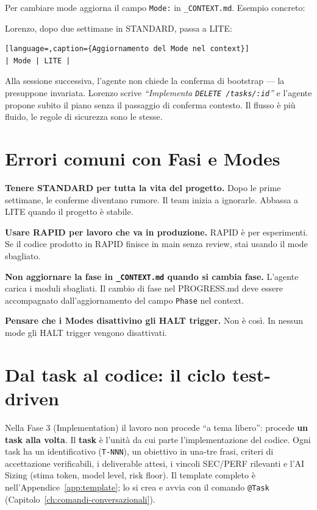 Per cambiare mode aggiorna il campo \texttt{Mode:} in \texttt{\_CONTEXT.md}. Esempio concreto:

Lorenzo, dopo due settimane in STANDARD, passa a LITE:

\begin{lstlisting}[language=,caption={Aggiornamento del Mode nel context}]
| Mode | LITE |
\end{lstlisting}

Alla sessione successiva, l'agente non chiede la conferma di bootstrap --- la presuppone invariata. Lorenzo scrive \textit{``Implementa \texttt{DELETE /tasks/:id}''} e l'agente propone subito il piano senza il passaggio di conferma contesto. Il flusso è più fluido, le regole di sicurezza sono le stesse.

\section{Errori comuni con Fasi e Modes}
\label{sec:06-errori}

\textbf{Tenere STANDARD per tutta la vita del progetto.} Dopo le prime settimane, le conferme diventano rumore. Il team inizia a ignorarle. Abbassa a LITE quando il progetto è stabile.

\textbf{Usare RAPID per lavoro che va in produzione.} RAPID è per esperimenti. Se il codice prodotto in RAPID finisce in main senza review, stai usando il mode sbagliato.

\textbf{Non aggiornare la fase in \texttt{\_CONTEXT.md} quando si cambia fase.} L'agente carica i moduli sbagliati. Il cambio di fase nel PROGRESS.md deve essere accompagnato dall'aggiornamento del campo \texttt{Phase} nel context.

\textbf{Pensare che i Modes disattivino gli HALT trigger.} Non è così. In nessun mode gli HALT trigger vengono disattivati.

\section{Dal task al codice: il ciclo test-driven}
\label{sec:06-task-tdd}

Nella Fase 3 (Implementation) il lavoro non procede ``a tema libero'': procede \textbf{un task alla volta}. Il \textbf{task} è l'unità da cui parte l'implementazione del codice. Ogni task ha un identificativo (\texttt{T-NNN}), un obiettivo in una-tre frasi, criteri di accettazione verificabili, i deliverable attesi, i vincoli SEC/PERF rilevanti e l'AI Sizing (stima token, model level, risk floor). Il template completo è nell'Appendice~\ref{app:template}; lo si crea e avvia con il comando \texttt{@Task} (Capitolo~\ref{ch:comandi-conversazionali}).

